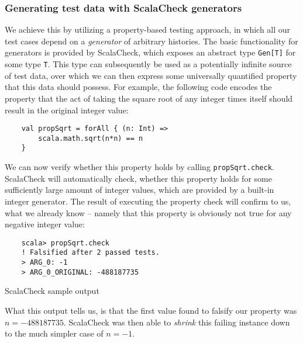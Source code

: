\subsubsection{Generating test data with ScalaCheck generators}
We achieve this by utilizing a property-based testing approach, in which all our test cases depend on a \emph{generator} of arbitrary histories. The basic functionality for generators is provided by ScalaCheck, which exposes an abstract type \texttt{Gen[T]} for some type \texttt{T}. This type can subsequently be used as a potentially infinite source of test data, over which we can then express some universally quantified property that this data should possess.
For example, the following code encodes the property that the act of taking the square root of any integer times itself should result in the original integer value: 
\begin{verbatim}
    val propSqrt = forAll { (n: Int) => 
        scala.math.sqrt(n*n) == n 
    }
\end{verbatim}

We can now verify whether this property holds by calling \texttt{propSqrt.check}. 
ScalaCheck will automatically check, whether this property holds for some sufficiently large amount of integer values, which are provided by a built-in integer generator. The result of executing the property check will confirm to us, what we already know -- namely that this property is obviously not true for any negative integer value: 
\begin{code}
    \begin{verbatim}
    scala> propSqrt.check
    ! Falsified after 2 passed tests.
    > ARG_0: -1
    > ARG_0_ORIGINAL: -488187735
    \end{verbatim} 
    \caption{ScalaCheck sample output}
\end{code}

What this output tells us, is that the first value found to falsify our property was \(n=-488187735\). ScalaCheck was then able to \emph{shrink} this failing instance down to the much simpler case of \(n=-1\).

